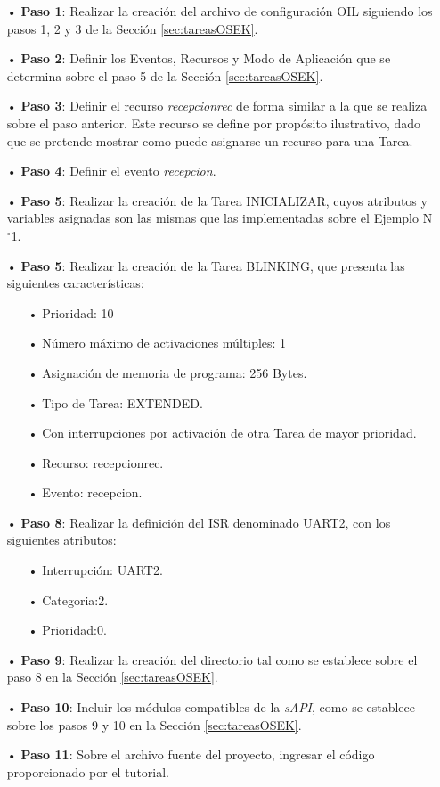 \documentclass[12pt,letterpaper]{article}
\begin{document}
\begin{enumerate}

\item[•]\textbf{Paso 1}: Realizar la creación del archivo de configuración OIL siguiendo los pasos 1, 2 y 3 de la Sección \ref{sec:tareasOSEK}.
\item[•]\textbf{Paso 2}: Definir los Eventos, Recursos y Modo de Aplicación que se determina sobre el paso 5 de la Sección \ref{sec:tareasOSEK}.
\item[•]\textbf{Paso 3}: Definir el recurso \textit{recepcionrec} de forma similar a la que se realiza sobre el paso anterior. Este recurso se define por propósito ilustrativo, dado que se pretende mostrar como puede asignarse un recurso para una Tarea.
\item[•]\textbf{Paso 4}: Definir el evento \textit{recepcion}.
\item[•]\textbf{Paso 5}: Realizar la creación de la Tarea INICIALIZAR, cuyos atributos y variables asignadas son las mismas que las implementadas sobre el Ejemplo N$^{\circ}$1.

\item[•]\textbf{Paso 5}: Realizar la creación de la Tarea BLINKING, que presenta las siguientes características:
\begin{enumerate}
\item[•]Prioridad: 10
\item[•]Número máximo de activaciones múltiples: 1
\item[•]Asignación de memoria de programa: 256 Bytes.
\item[•]Tipo de Tarea: EXTENDED.
\item[•]Con interrupciones por activación de otra Tarea de mayor prioridad.
\item[•]Recurso: recepcionrec.
\item[•]Evento: recepcion.
\end{enumerate}

\item[•]\textbf{Paso 8}: Realizar la definición del ISR denominado UART2, con los siguientes atributos:
\begin{enumerate}
\item[•]Interrupción: UART2.
\item[•]Categoria:2.
\item[•]Prioridad:0.
\end{enumerate}

\item[•]\textbf{Paso 9}: Realizar la creación del directorio tal como se establece sobre el paso 8 en la Sección \ref{sec:tareasOSEK}.
\item[•]\textbf{Paso 10}: Incluir los módulos compatibles de la \textit{sAPI}, como se establece sobre los pasos 9 y 10 en la Sección \ref{sec:tareasOSEK}.
\item[•]\textbf{Paso 11}: Sobre el archivo fuente del proyecto, ingresar el código proporcionado por el tutorial.

\end{enumerate}
\end{document}
